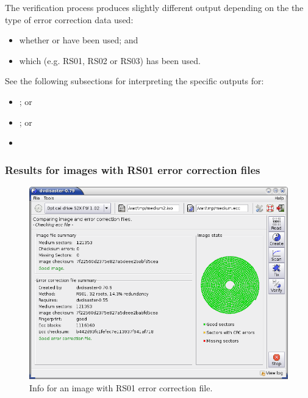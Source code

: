 \newpage

The verification process produces slightly different output
depending on the the type of error correction data used:

\begin{itemize}
\item whether  or
   have been used; and
\item which 
  (e.g. RS01, RS02 or RS03) has been used.
\end{itemize}

See the following subsections for interpreting the specific outputs for:

\begin{itemize}
\item {}; or
\item {}; or
\item {}
\end{itemize}

\subsubsection{Results for images with RS01 error correction files}
\label{howto-info-rs01}

\begin{figure}[h]
\centerline{\includegraphics[width=\textwidth]{screenshots/info-okay-rs01.png}}
\caption{Info for an image with RS01 error correction file.}
\label{howto-info-good-rs01}
\end{figure}

